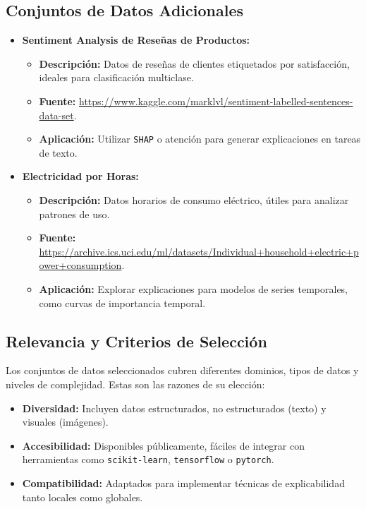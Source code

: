 \begin{refsection}
\subsection{Conjuntos de Datos Adicionales}
\begin{itemize}
    \item \textbf{Sentiment Analysis de Reseñas de Productos:}
    \begin{itemize}
        \item \textbf{Descripción:} Datos de reseñas de clientes etiquetados por satisfacción, ideales para clasificación multiclase.
        \item \textbf{Fuente:} \url{https://www.kaggle.com/marklvl/sentiment-labelled-sentences-data-set}.
        \item \textbf{Aplicación:} Utilizar \texttt{SHAP} o atención para generar explicaciones en tareas de texto.
    \end{itemize}
    
    \item \textbf{Electricidad por Horas:}
    \begin{itemize}
        \item \textbf{Descripción:} Datos horarios de consumo eléctrico, útiles para analizar patrones de uso.
        \item \textbf{Fuente:} \url{https://archive.ics.uci.edu/ml/datasets/Individual+household+electric+power+consumption}.
        \item \textbf{Aplicación:} Explorar explicaciones para modelos de series temporales, como curvas de importancia temporal.
    \end{itemize}
\end{itemize}

\subsection{Relevancia y Criterios de Selección}
Los conjuntos de datos seleccionados cubren diferentes dominios, tipos de datos y niveles de complejidad. Estas son las razones de su elección:
\begin{itemize}
    \item \textbf{Diversidad:} Incluyen datos estructurados, no estructurados (texto) y visuales (imágenes).
    \item \textbf{Accesibilidad:} Disponibles públicamente, fáciles de integrar con herramientas como \texttt{scikit-learn}, \texttt{tensorflow} o \texttt{pytorch}.
    \item \textbf{Compatibilidad:} Adaptados para implementar técnicas de explicabilidad tanto locales como globales.
\end{itemize}




\end{refsection}
